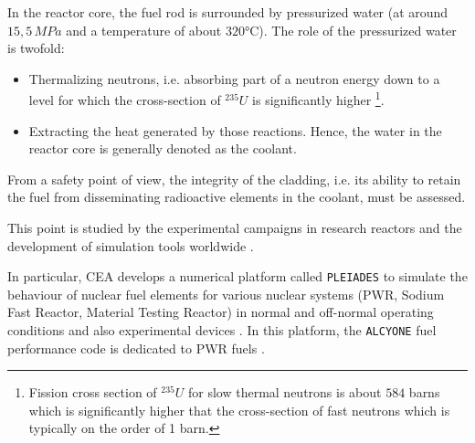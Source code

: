 In the reactor core, the fuel rod is surrounded by pressurized water (at
around \(15,5\, MPa\) and a temperature of about $320$°C). The role of the
pressurized water is twofold:

\begin{itemize}
    \item Thermalizing neutrons, i.e. absorbing part of a neutron energy down to
    a level for which the cross-section of \(\mbox{}^{235}U\) is
    significantly higher \footnote{Fission cross section of \(\mbox{}^{235}U\) for slow thermal
    neutrons is about \(584\) barns which is significantly higher that the
    cross-section of fast neutrons which is typically on the order of 1
    barn.}.
    \item Extracting the heat generated by those reactions. Hence, the water in
    the reactor core is generally denoted as the coolant.
\end{itemize}




From a safety point of view, the integrity of the cladding, i.e. its
ability to retain the fuel from disseminating radioactive elements in
the coolant, must be assessed.

This point is studied by the experimental campaigns in research reactors
and the development of simulation tools worldwide
\cite{garcia_mono-dimensional_2002, williamson_multidimensional_2012, di_marcello_transuranus_2014, largenton_cyrano3_2014, petry_cyrano3_2015, qi_qualification_2019,scolaro_offbeat_2020}.

In particular, CEA develops a numerical platform called \texttt{PLEIADES}
\cite{marelle_new_2016} to simulate the behaviour of nuclear fuel elements
for various nuclear systems (PWR, Sodium Fast Reactor, Material Testing Reactor) in normal and
off-normal operating conditions and also experimental devices
\cite{lainet_recent_2013, helfer_licos_2015}. In this platform, the
\texttt{ALCYONE} fuel performance code is dedicated to PWR fuels
\cite{helfer_recent_2015, marelle_new_2016, guenot-delahaie_simulation_2017}.

